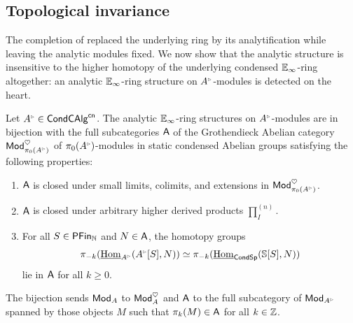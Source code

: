 \subsection{Topological invariance}\label{subsec: topological invariance}
The completion of  replaced the underlying ring by its analytification while leaving the analytic modules fixed. We now show that the analytic structure is insensitive to the higher homotopy of the underlying condensed $\mathbb{E}_{\infty}$-ring altogether: an analytic $\mathbb{E}_{\infty}$-ring structure on $A^{\tri}$-modules is detected on the heart.
\begin{theorem}\label{thm: heart recognition for analytic rings}
    Let $A^{\tri}\in\Cond\CAlg^{\cn}$. The analytic $\mathbb{E}_{\infty}$-ring structures on $A^{\tri}$-modules are in bijection with the full subcategories $\mathsf{A}$ of the Grothendieck Abelian category $\Mod_{\pi_{0}(A^{\tri})}^{\heartsuit}$ of $\pi_{0}(A^{\tri})$-modules in static condensed Abelian groups satisfying the following properties:
     \begin{enumerate}[label=(\roman*)]
        \item $\mathsf{A}$ is closed under small limits, colimits, and extensions in $\Mod_{\pi_{0}(A^{\tri})}^{\heartsuit}$. 
        \item $\mathsf{A}$ is closed under arbitrary higher derived products $\prod^{(n)}_{I}$. 
        \item For all $S\in\mathsf{PFin}_{\mathbb{N}}$ and $N\in\mathsf{A}$, the homotopy groups 
        $$\pi_{-k}(\intHom_{A^{\tri}}(A^{\tri}[S],N))\simeq\pi_{-k}(\intHom_{\Cond\Sp}(\Sph[S],N))$$ 
        lie in $\mathsf{A}$ for all $k\geq0$. 
    \end{enumerate}
    The bijection sends $\mathsf{Mod}_{A}$ to $\mathsf{Mod}_{A}^{\heartsuit}$ and $\mathsf{A}$ to the full subcategory of $\Mod_{A^{\tri}}$ spanned by those objects $M$ such that $\pi_{k}(M)\in\mathsf{A}$ for all $k\in\mathbb{Z}$. 
\end{theorem}
